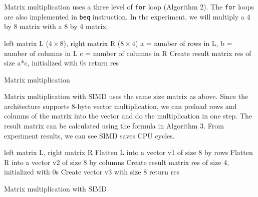 \documentclass{sig-alternate}
\begin{document}
Matrix multiplication uses a three level of \texttt{for} loop (Algorithm 2). The \texttt{for} loops are also implemented in \texttt{beq} instruction. In the experiment, we will multiply a 4 by 8 matrix with a 8 by 4 matrix.

\begin{algorithm}[h]
\SetAlgoLined
 left matrix L ($4 \times 8$), right matrix R ($8 \times 4$)\;
 a = number of rows in L, b = number of columns in L\;  
 c = number of columns in R\;
 Create result matrix res of size a*c, initialized with 0s\;
 return res\;
 \caption{Matrix multiplication}
\end{algorithm}

Matrix multiplication with SIMD uses the same size matrix as above. Since the architecture supports 8-byte vector multiplication, we can preload rows and columns of the matrix into the vector and do the multiplication in one step. The result matrix can be calculated using the formula in Algorithm 3. From experiment results, we can see SIMD saves CPU cycles. 

\begin{algorithm}[h]
\SetAlgoLined
 left matrix L, right matrix R\;
 Flatten L into a vector v1 of size 8 by rows\;
 Flatten R into a vector v2 of size 8 by columns\;
 Create result matrix res of size 4, initialized with 0s\; 
 Create vector v3 with size 8\;
 return res\;
 \caption{Matrix multiplication with SIMD}
\end{algorithm}
\end{document}

